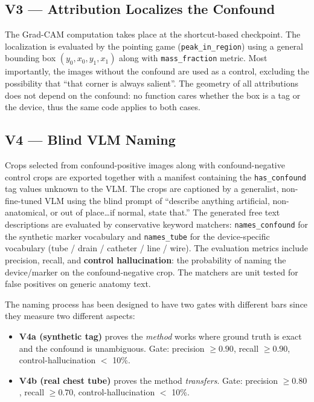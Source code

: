 \documentclass{ieeeaccess}
\begin{document}
\subsection{V3 --- Attribution Localizes the Confound}
The Grad-CAM computation takes place at the shortcut-based checkpoint. The localization is evaluated by the pointing game (\texttt{peak\_in\_region}) using a general bounding box $(y_0, x_0, y_1, x_1)$ along with \texttt{mass\_fraction} metric. Most importantly, the images without the confound are used as a control, excluding the possibility that ``that corner is always salient''. The geometry of all attributions does not depend on the confound: no function cares whether the box is a tag or the device, thus the same code applies to both cases.

\subsection{V4 --- Blind VLM Naming}
Crops selected from confound-positive images along with confound-negative control crops are exported together with a manifest containing the \texttt{has\_confound} tag values unknown to the VLM. The crops are captioned by a generalist, non-fine-tuned VLM using the blind prompt of ``describe anything artificial, non-anatomical, or out of place\ldots if normal, state that.'' The generated free text descriptions are evaluated by conservative keyword matchers: \texttt{names\_confound} for the synthetic marker vocabulary and \texttt{names\_tube} for the device-specific vocabulary (tube / drain / catheter / line / wire). The evaluation metrics include precision, recall, and \textbf{control hallucination}: the probability of naming the device/marker on the confound-negative crop. The matchers are unit tested for false positives on generic anatomy text.

The naming process has been designed to have two gates with different bars since they measure two different aspects:
\begin{itemize}
\item \textbf{V4a (synthetic tag)} proves the \emph{method} works where ground truth is exact and the confound is unambiguous. Gate: precision $\geq 0.90$, recall $\geq 0.90$, control-hallucination $<$ 10\%.
\item \textbf{V4b (real chest tube)} proves the method \emph{transfers}. Gate: precision $\geq 0.80$, recall $\geq 0.70$, control-hallucination $<$ 10\%.
\end{itemize}
\end{document}
